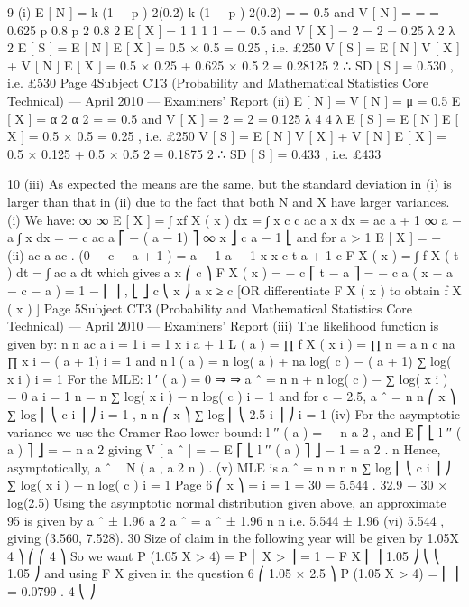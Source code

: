 \documentclass[a4paper,12pt]{article}
\begin{document}
9
(i)
E [ N ] = k (1 − p ) 2(0.2)
k (1 − p ) 2(0.2)
=
= 0.5 and V [ N ] =
=
= 0.625
p
0.8
p 2
0.8 2
E [ X ] = 1 1
1
1
= = 0.5 and V [ X ] = 2 = 2 = 0.25
λ 2
λ
2
E [ S ] = E [ N ] E [ X ] = 0.5 × 0.5 = 0.25 , i.e. £250
V [ S ] = E [ N ] V [ X ] + V [ N ] { E [ X ] } = 0.5 × 0.25 + 0.625 × 0.5 2 = 0.28125
2
∴ SD [ S ] = 0.530 , i.e. £530
Page 4Subject CT3 (Probability and Mathematical Statistics Core Technical) — April 2010 — Examiners’ Report
(ii)
E [ N ] = V [ N ] = μ = 0.5
E [ X ] =
α 2
α
2
= = 0.5 and V [ X ] = 2 = 2 = 0.125
λ 4
4
λ
E [ S ] = E [ N ] E [ X ] = 0.5 × 0.5 = 0.25 , i.e. £250
V [ S ] = E [ N ] V [ X ] + V [ N ] { E [ X ] } = 0.5 × 0.125 + 0.5 × 0.5 2 = 0.1875
2
∴ SD [ S ] = 0.433 , i.e. £433


\newpage

10
(iii) As expected the means are the same,
but the standard deviation in (i) is larger than that in (ii) due to the fact that
both N and X have larger variances.
(i) We have:
∞
∞
E [ X ] = ∫ xf X ( x ) dx = ∫ x
c
c
ac a
x
dx = ac
a + 1
∞
a
− a
∫ x dx = −
c
ac a ⎡ − ( a − 1) ⎤ ∞
x
⎦ c
a − 1 ⎣
and for a > 1
E [ X ] = −
(ii)
ac a
ac
.
(0 − c − a + 1 ) =
a − 1
a − 1
x x
c t a + 1
c
F X ( x ) = ∫ f X ( t ) dt = ∫
ac a
dt
which gives
a
x
⎛ c ⎞
F X ( x ) = − c ⎡ t − a ⎤ = − c a ( x − a − c − a ) = 1 − ⎜ ⎟ ,
⎣ ⎦ c
⎝ x ⎠
a
x ≥ c
[OR differentiate F X ( x ) to obtain f X ( x ) ]
Page 5Subject CT3 (Probability and Mathematical Statistics Core Technical) — April 2010 — Examiners’ Report
(iii)
The likelihood function is given by:
n n ac a
i = 1 i = 1 x i a + 1
L ( a ) = ∏ f X ( x i ) = ∏
n
= a n c na ∏ x i − ( a + 1)
i = 1
and
n
l ( a ) = n log( a ) + na log( c ) − ( a + 1) ∑ log( x i )
i = 1
For the MLE:
l ′ ( a ) = 0 ⇒
⇒ a ˆ =
n
n
+ n log( c ) − ∑ log( x i ) = 0
a
i = 1
n
=
n
∑ log( x i ) − n log( c )
i = 1
and for c = 2.5, a ˆ =
n
n
⎛ x ⎞
∑ log ⎜ ⎝ c i ⎟ ⎠
i = 1
,
n
n
⎛ x ⎞
∑ log ⎜ ⎝ 2.5 i ⎟ ⎠
i = 1
(iv)
For the asymptotic variance we use the Cramer-Rao lower bound:
l ′′ ( a ) = −
n
a
2
, and E ⎡ ⎣ l ′′ ( a ) ⎤ ⎦ = −
n
a 2
giving
{
}
V [ a ˆ ] = − E ⎡ ⎣ l ′′ ( a ) ⎤ ⎦
− 1
=
a 2
.
n
Hence, asymptotically, a ˆ ~ N ( a , a 2 n ) .
(v)
MLE is
a ˆ =
n
n
n
n
∑ log ⎜ ⎝ c i ⎟ ⎠ ∑ log( x i ) − n log( c )
i = 1
Page 6
⎛ x ⎞
=
i = 1
=
30
= 5.544 .
32.9 − 30 × log(2.5)
Using the asymptotic normal distribution given above, an approximate 95%
is given by
a ˆ ± 1.96
a 2
a ˆ
= a ˆ ± 1.96
n
n
i.e. 5.544 ± 1.96
(vi)
5.544
, giving (3.560, 7.528).
30
Size of claim in the following year will be given by 1.05X
4 ⎞
⎛
⎛ 4 ⎞
So we want P (1.05 X > 4) = P ⎜ X >
⎟ = 1 − F X ⎜
⎟
1.05 ⎠
⎝
⎝ 1.05 ⎠
and using F X given in the question
6
⎛ 1.05 × 2.5 ⎞
P (1.05 X > 4) = ⎜
⎟ = 0.0799 .
4
⎝
⎠

\end{document}

